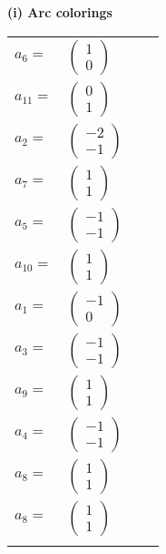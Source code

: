 \documentclass[1p]{elsarticle_modified}
\theoremstyle{definition}
\begin{document}
\flushleft \textbf{(i) Arc colorings}\\
\begin{tabular}{m{7pt} m{180pt} m{7pt} m{180pt} }
\flushright $a_{6}=$&$\begin{pmatrix}1\\0\end{pmatrix}$ \\
\flushright $a_{11}=$&$\begin{pmatrix}0\\1\end{pmatrix}$ \\
\flushright $a_{2}=$&$\begin{pmatrix}-2\\-1\end{pmatrix}$ \\
\flushright $a_{7}=$&$\begin{pmatrix}1\\1\end{pmatrix}$ \\
\flushright $a_{5}=$&$\begin{pmatrix}-1\\-1\end{pmatrix}$ \\
\flushright $a_{10}=$&$\begin{pmatrix}1\\1\end{pmatrix}$ \\
\flushright $a_{1}=$&$\begin{pmatrix}-1\\0\end{pmatrix}$ \\
\flushright $a_{3}=$&$\begin{pmatrix}-1\\-1\end{pmatrix}$ \\
\flushright $a_{9}=$&$\begin{pmatrix}1\\1\end{pmatrix}$ \\
\flushright $a_{4}=$&$\begin{pmatrix}-1\\-1\end{pmatrix}$ \\
\flushright $a_{8}=$&$\begin{pmatrix}1\\1\end{pmatrix}$\\ \flushright $a_{8}=$&$\begin{pmatrix}1\\1\end{pmatrix}$\\&\end{tabular}
\end{document}
